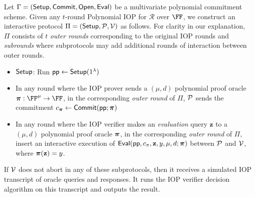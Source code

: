 Let $\Gamma = (\textsf{{Setup}}, \textsf{{Commit}}, \textsf{{Open}}, \textsf{{Eval}})$ be a multivariate polynomial commitment scheme. Given any $t$-round Polynomial IOP for $\mathcal{R}$ over $\FF$, we construct an interactive protocol $\Pi = (\textsf{{Setup}}, \mathcal{P}, \mathcal{V})$ as follows. For clarity in our explanation, $\Pi$ consists of $t$ \emph{outer rounds} corresponding to the original IOP rounds and \emph{subrounds} where subprotocols may add additional rounds of interaction between outer rounds.
\begin{itemize}
\item $\textsf{{Setup}}$: Run $\textsf{pp} \leftarrow \textsf{{Setup}}(1^\lambda)$
\item In any round where the IOP prover sends a $(\mu, d)$ polynomial proof oracle $\proofO: \FF^\mu \rightarrow \FF$, in the corresponding \emph{outer round} of $\Pi$, $\mathcal{P}$ sends the commitment $c_{\boldsymbol{\pi}} \leftarrow \textsf{{Commit}}(\textsf{pp}; \boldsymbol{\pi})$
\item In any round where the IOP verifier makes an \emph{evaluation} query $\mathbf{z}$ to a $(\mu, d)$ polynomial proof oracle $\boldsymbol{\pi}$, in the corresponding \emph{outer round} of $\Pi$, insert an interactive execution of $\textsf{{Eval}}(\textsf{pp}, c_\pi, \mathbf{z}, y, \mu, d; \boldsymbol{\pi})$ between $\mathcal{P}$ and $\mathcal{V}$, where $\boldsymbol{\pi}(\mathbf{z}) = y$. 
\end{itemize}

If $\mathcal{V}$ does not abort in any of these subprotocols, then it receives a simulated IOP transcript of oracle queries and responses. It runs the IOP verifier decision algorithm on this transcript and outputs the result.


